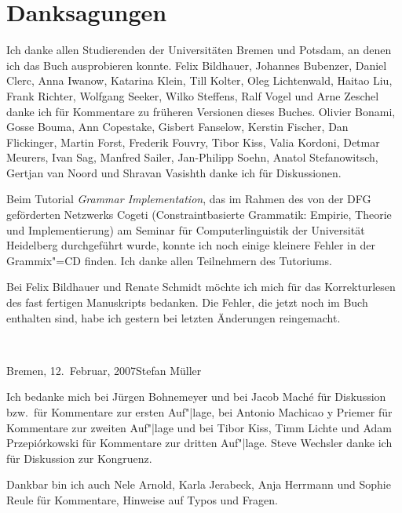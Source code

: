 
\chapter*{Danksagungen}

Ich danke allen Studierenden der Universitäten Bremen und Potsdam, 
an denen ich das Buch ausprobieren konnte.
Felix Bildhauer,
Johannes Bubenzer, %
Daniel Clerc, %
Anna Iwanow, %
Katarina Klein, 
Till Kolter, 
Oleg Lichtenwald, 
Haitao Liu,
Frank Richter,
Wolfgang Seeker,
Wilko Steffens,
Ralf Vogel
und
Arne Zeschel
danke ich für Kommentare zu früheren Versionen dieses Buches.
Olivier Bonami, %
Gosse Bouma, 
Ann Copestake, 
Gisbert Fanselow, 
Kerstin Fischer, 
Dan Flickinger, 
Martin Forst,
Frederik Fouvry,
Tibor Kiss, 
Valia Kordoni, 
Detmar Meurers, 
Ivan Sag, 
Manfred Sailer,       %
Jan-Philipp Soehn,    %
Anatol Stefanowitsch,
Gertjan van Noord
und
Shravan Vasishth %
danke ich für Diskussionen.

Beim Tutorial \emph{Grammar Implementation}, das im Rahmen des von der DFG geförderten Netzwerks
Cogeti (Constraintbasierte Grammatik: Empirie, Theorie und Implementierung) am Seminar für
Computerlinguistik der Universität Heidelberg durchgeführt wurde,
konnte ich noch einige kleinere Fehler in der Grammix"=CD finden. Ich danke allen Teilnehmern des Tutoriums.

Bei Felix Bildhauer und Renate Schmidt möchte ich mich für das Korrekturlesen des fast fertigen
Manuskripts bedanken. Die Fehler, die jetzt noch im Buch enthalten sind, habe ich gestern bei
letzten Änderungen reingemacht.

~\medskip

\noindent
Bremen, 12.\ Februar, 2007\hfill Stefan Müller


Ich bedanke mich bei Jürgen Bohnemeyer und bei Jacob Maché für Diskussion bzw.\ für Kommentare zur
ersten Auf"|lage, bei Antonio Machicao y Priemer für
Kommentare zur zweiten Auf"|lage und bei Tibor Kiss, Timm Lichte und Adam
Przepiórkowski für Kommentare zur dritten Auf"|lage. Steve Wechsler
danke ich für Diskussion zur Kongruenz.


Dankbar bin ich auch Nele Arnold, Karla Jerabeck, Anja Herrmann und Sophie Reule für Kommentare, Hinweise auf Typos und Fragen.

